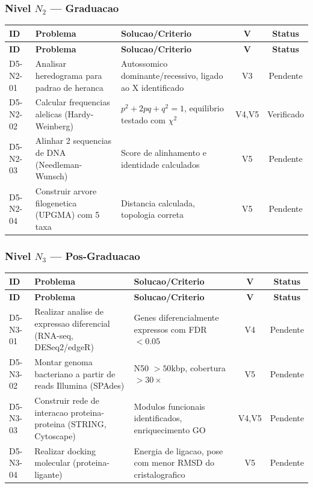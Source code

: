 \subsubsection{Nivel $N_2$ --- Graduacao}

\begin{longtable}{|p{2.0cm}|p{4.2cm}|p{4.2cm}|c|c|}
\hline
\textbf{ID} & \textbf{Problema} & \textbf{Solucao/Criterio} & \textbf{V} & \textbf{Status} \\
\hline
\endfirsthead
\hline
\textbf{ID} & \textbf{Problema} & \textbf{Solucao/Criterio} & \textbf{V} & \textbf{Status} \\
\hline
\endhead
\hline
\endfoot
D5-N2-01 & Analisar heredograma para padrao de heranca & Autossomico dominante/recessivo, ligado ao X identificado & V3 & Pendente \\
\hline
D5-N2-02 & Calcular frequencias alelicas (Hardy-Weinberg) & $p^{2}+2pq+q^{2}=1$, equilibrio testado com $\chi^{2}$ & V4,V5 & Verificado \\
\hline
D5-N2-03 & Alinhar 2 sequencias de DNA (Needleman-Wunsch) & Score de alinhamento e identidade calculados & V5 & Pendente \\
\hline
D5-N2-04 & Construir arvore filogenetica (UPGMA) com 5 taxa & Distancia calculada, topologia correta & V5 & Pendente \\
\hline
\end{longtable}

\subsubsection{Nivel $N_3$ --- Pos-Graduacao}

\begin{longtable}{|p{2.0cm}|p{4.2cm}|p{4.2cm}|c|c|}
\hline
\textbf{ID} & \textbf{Problema} & \textbf{Solucao/Criterio} & \textbf{V} & \textbf{Status} \\
\hline
\endfirsthead
\hline
\textbf{ID} & \textbf{Problema} & \textbf{Solucao/Criterio} & \textbf{V} & \textbf{Status} \\
\hline
\endhead
\hline
\endfoot
D5-N3-01 & Realizar analise de expressao diferencial (RNA-seq, DESeq2/edgeR) & Genes diferencialmente expressos com FDR $<0.05$ & V4 & Pendente \\
\hline
D5-N3-02 & Montar genoma bacteriano a partir de reads Illumina (SPAdes) & N50 $>50$kbp, cobertura $>30\times$ & V5 & Pendente \\
\hline
D5-N3-03 & Construir rede de interacao proteina-proteina (STRING, Cytoscape) & Modulos funcionais identificados, enriquecimento GO & V4,V5 & Pendente \\
\hline
D5-N3-04 & Realizar docking molecular (proteina-ligante) & Energia de ligacao, pose com menor RMSD do cristalografico & V5 & Pendente \\
\hline
\end{longtable}

